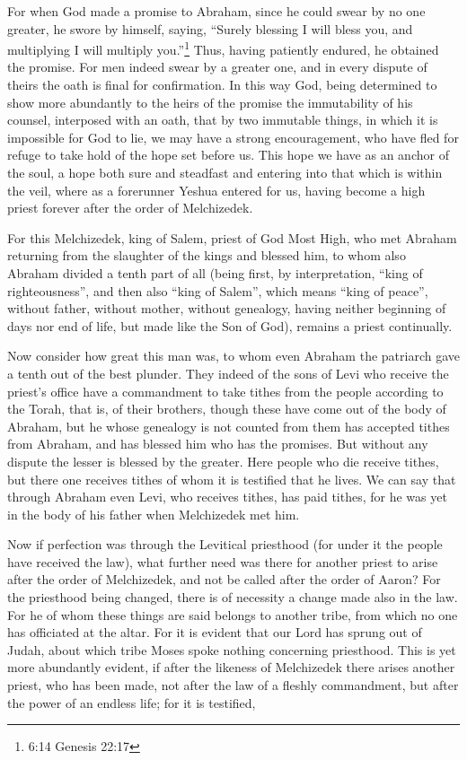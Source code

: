 \myverse{}For when God made a promise to Abraham, since he could swear
by no one greater, he swore by himself,
\myverse{}saying, “Surely blessing I will bless you, and multiplying I will multiply
you.”\footnote{6:14 Genesis 22:17}
\myverse{}Thus, having patiently endured, he obtained the promise.
\myverse{}For men indeed swear by a greater one, and in every dispute of theirs the
oath is final for confirmation.
\myverse{}In this way God, being determined to show more abundantly to the heirs of
the promise the immutability of his counsel, interposed with an oath,
\myverse{}that by two immutable things, in which it is impossible for God to lie, we
may have a strong encouragement, who have fled for refuge to take hold of the hope set before us.
\myverse{}This hope we have as an anchor of the soul, a hope both sure and steadfast
and entering into that which is within the veil,
\myverse{}where as a forerunner Yeshua entered for us, having become a high priest forever
after the order of Melchizedek.


\mychapter{} \myverse*{}For this Melchizedek, king of Salem, priest of God Most High, who
met Abraham returning from the slaughter of the kings and blessed him,
\myverse{}to whom also Abraham divided a tenth part of all (being first, by interpretation,
“king of righteousness”, and then also “king of Salem”, which means “king of peace”,
\myverse{}without father, without mother, without genealogy, having neither beginning
of days nor end of life, but made like the Son of God), remains a priest continually.

\myverse{}Now consider how great this man was, to whom even Abraham the patriarch
gave a tenth out of the best plunder.
\myverse{}They indeed of the sons of Levi who receive the priest’s office have a commandment
to take tithes from the people according to the Torah, that is, of their brothers, though these have come
out of the body of Abraham,
\myverse{}but he whose genealogy is not counted from them has accepted tithes from Abraham,
and has blessed him who has the promises.
\myverse{}But without any dispute the lesser is blessed by the greater.
\myverse{}Here people who die receive tithes, but there one receives tithes of whom it
is testified that he lives.
\myverse{}We can say that through Abraham even Levi, who receives tithes, has paid tithes,
\myverse{}for he was yet in the body of his father when Melchizedek met him.

\myverse{}Now if perfection was through the Levitical priesthood (for under
it the people have received the law), what further need was there for another priest to arise after the order of Melchizedek, and not be called after the order of Aaron? \myverse{}For the priesthood being changed, there is of necessity a change made also in the law. \myverse{}For he of whom these things are said belongs to another tribe, from which no one has officiated at the altar. \myverse{}For it is evident that our Lord has sprung out of Judah, about which tribe Moses spoke nothing concerning priesthood. \myverse{}This is yet more abundantly evident, if after the likeness of Melchizedek
there arises another priest,
\myverse{}who has been made, not after the law of a fleshly commandment, but after the
power of an endless life;
\myverse{}for it is testified,

